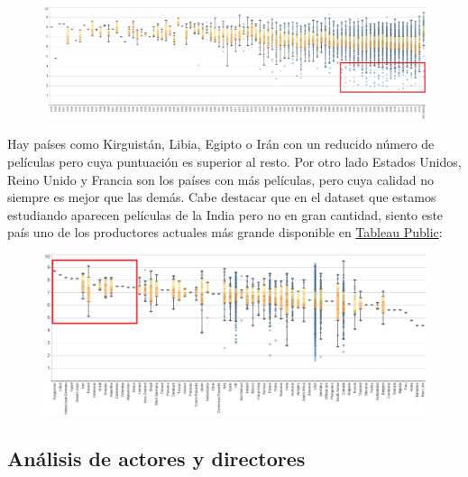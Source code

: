 \documentclass{article}
\begin{document}
\begin{figure}[h]
\centering
\includegraphics[width=\textwidth,keepaspectratio]{./images/rating_year}
\end{figure}

\clearpage

Hay países como Kirguistán, Libia, Egipto o Irán con un reducido número de películas pero cuya puntuación es superior al resto. Por otro lado Estados Unidos, Reino Unido y Francia son los países con más películas, pero cuya calidad no siempre es mejor que las demás. Cabe destacar que en el dataset que estamos estudiando aparecen películas de la India pero no en gran cantidad, siento este país uno de los productores actuales más grande disponible en \href{https://public.tableau.com/profile/javier6580\#!/vizhome/proyecto_fin_de_master_dataset/rating_country}{Tableau Public}:

\begin{figure}[h]
\centering
\includegraphics[width=\textwidth,keepaspectratio]{./images/rating_country}
\end{figure}

\subsection{Análisis de actores y directores}
\end{document}
